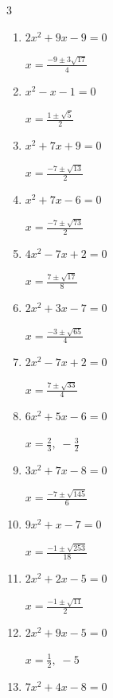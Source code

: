 \begin{multicols}{3}
\begin{enumerate}
        $\displaystyle x=\frac{1\pm \sqrt{253}}{14}$

  \item $2x^{2}+9x-9=0$

        $\displaystyle x=\frac{-9\pm 3\sqrt{17}}{4}$

  \item $x^{2}-x-1=0$

        $\displaystyle x=\frac{1\pm \sqrt{5}}{2}$

  \item $x^{2}+7x+9=0$

        $\displaystyle x=\frac{-7\pm \sqrt{13}}{2}$

  \item $x^{2}+7x-6=0$

        $\displaystyle x=\frac{-7\pm \sqrt{73}}{2}$

  \item $4x^{2}-7x+2=0$

        $\displaystyle x=\frac{7\pm \sqrt{17}}{8}$

  \item $2x^{2}+3x-7=0$

        $\displaystyle x=\frac{-3\pm \sqrt{65}}{4}$

\columnbreak %

  \item $2x^{2}-7x+2=0$

        $\displaystyle x=\frac{7\pm \sqrt{33}}{4}$

  \item $6x^{2}+5x-6=0$

        $\displaystyle x=\frac{2}{3}, \; -\frac{3}{2}$

  \item $3x^{2}+7x-8=0$

        $\displaystyle x=\frac{-7\pm \sqrt{145}}{6}$

  \item $9x^{2}+x-7=0$

        $\displaystyle x=\frac{-1\pm \sqrt{253}}{18}$

  \item $2x^{2}+2x-5=0$

        $\displaystyle x=\frac{-1\pm \sqrt{11}}{2}$

  \item $2x^{2}+9x-5=0$

        $\displaystyle x=\frac{1}{2}, \; -5$

  \item $7x^{2}+4x-8=0$


\end{enumerate}
\end{multicols}
